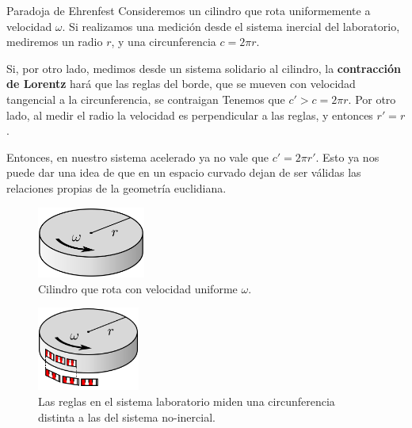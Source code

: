 \begin{remarkbox}{Paradoja de Ehrenfest}
Consideremos un cilindro que rota uniformemente a velocidad $\omega$. Si realizamos una medición desde el sistema inercial del laboratorio, mediremos un radio $r$, y una circunferencia $c=2\pi r$.


Si, por otro lado, medimos desde un sistema solidario al cilindro, la \textbf{contracción de Lorentz} hará que las reglas del borde, que se mueven con velocidad tangencial a la circunferencia, se contraigan Tenemos que $c'>c=2\pi r$. Por otro lado, al medir el radio la velocidad es perpendicular a las reglas, y entonces $r'=r$.

Entonces, en nuestro sistema acelerado ya no vale que $c'=2\pi r'$. Esto ya nos puede dar una idea de que en un espacio curvado dejan de ser válidas las relaciones propias de la geometría euclidiana.

\end{remarkbox}
\begin{figure}
    \centering
    \includegraphics[width=0.315\textwidth]{Im/Spinning-disk.svg.png}
    \caption{Cilindro que rota con velocidad uniforme $\omega$.}
    \label{fig:sen}
\end{figure}

\begin{figure}
    \centering
    \includegraphics[width=0.3\textwidth]{Im/220px-Ehrenfest-paradox-disk.svg.png}
    \caption{Las reglas en el sistema laboratorio miden una circunferencia distinta a las del sistema no-inercial.}
    \label{fig:sen}
\end{figure}



